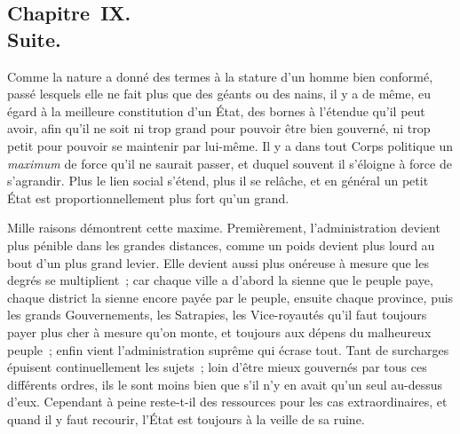 \documentclass[french,twoside]{book} %
\begin{document}
\subsection[{Chapitre IX. Suite.}]{Chapitre IX. \\
Suite.}
\noindent Comme la nature a donné des termes à la stature d’un homme bien conformé, passé lesquels elle ne fait plus que des géants ou des nains, il y a de même, eu égard à la meilleure constitution d’un État, des bornes à l’étendue qu’il peut avoir, afin qu’il ne soit ni trop grand pour pouvoir être bien gouverné, ni trop petit pour pouvoir se maintenir par lui-même. Il y a dans tout Corps politique un {\itshape maximum} de force qu’il ne saurait passer, et duquel souvent il s’éloigne à force de s’agrandir. Plus le lien social s’étend, plus il se relâche, et en général un petit État est proportionnellement plus fort qu’un grand.\par
Mille raisons démontrent cette maxime. Premièrement, l’administration devient plus pénible dans les grandes distances, comme un poids devient plus lourd au bout d’un plus grand levier. Elle devient aussi plus onéreuse à mesure que les degrés se multiplient ; car chaque ville a d’abord la sienne que le peuple paye, chaque district la sienne encore payée par le peuple, ensuite chaque province, puis les grands Gouvernements, les Satrapies, les Vice-royautés qu’il faut toujours payer plus cher à mesure qu’on monte, et toujours aux dépens du malheureux peuple ; enfin vient l’administration suprême qui écrase tout. Tant de surcharges épuisent continuellement les sujets ; loin d’être mieux gouvernés par tous ces différents ordres, ils le sont moins bien que s’il n’y en avait qu’un seul au-dessus d’eux. Cependant à peine reste-t-il des ressources pour les cas extraordinaires, et quand il y faut recourir, l’État est toujours à la veille de sa ruine.\par
\end{document}
